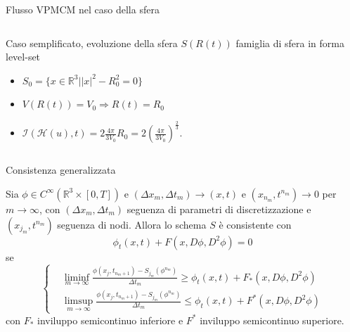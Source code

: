 \begin{frame}{Flusso VPMCM nel caso della sfera}
  \begin{columns}[T]
    \begin{column}{6.5cm}
      \begin{exampleblock}{Caso semplificato, evoluzione della sfera}
        $S(R(t))$ famiglia di sfera in forma level-set
        \begin{itemize}
        \item $S_0=\{x\in\mathbb{R}^3| |x|^2-R_0^2=0\}$
        \item $V(R(t))=V_0\Rightarrow R(t)=R_0$
        \item $\mathcal{I}(\mathcal{H}(u),t)=2\frac{4\pi}{3V_0}R_0=2\left(\frac{4\pi}{3V_0}\right)^\frac{2}{3}$.
        \end{itemize}
      \end{exampleblock}
    \end{column}
    \begin{column}[T]{3.5cm}
      \begin{center}
      \end{center}
  \end{column}
\end{columns}
\end{frame}

\begin{frame}{Consistenza generalizzata}
  \begin{definizione}[Consistenza]
    Sia $\phi\in C^{\infty}(\mathbb{R}^3\times[0,T])$ e $(\Delta
    x_m,\Delta t_m)\to (x,t)$ e  $(x_{n_m},t^{n_m})\to 0$  per
    $m\to\infty$, con $(\Delta x_m,\Delta t_m)$  seguenza di
    parametri di discretizzazione e $(x_{j_m},t^{n_m})$ seguenza di
    nodi. Allora lo schema $S$ è consistente con
    \[
    \phi_t(x,t)+F(x,D\phi,D^2\phi)=0
    \]
    se
    \[
    \left\{
    \begin{aligned}
      &\liminf_{m\to\infty}\frac{\phi(x_j,t_{n_m+1})-S_{j_m}(\phi^{n_m})}{\Delta
        t_m}\geq\phi_t(x,t)+F_*(x,D\phi,D^2\phi)
        \\
       &\limsup_{m\to\infty}\frac{\phi(x_j,t_{n_m+1})-S_{j_m}(\phi^{n_m})}{\Delta
          t_m}\leq\phi_t(x,t)+F^*(x,D\phi,D^2\phi)
    \end{aligned}
    \right.
    \]
    con $F_*$ inviluppo semicontinuo inferiore e $F^*$ inviluppo
    semicontinuo superiore.
  \end{definizione}
\end{frame}

